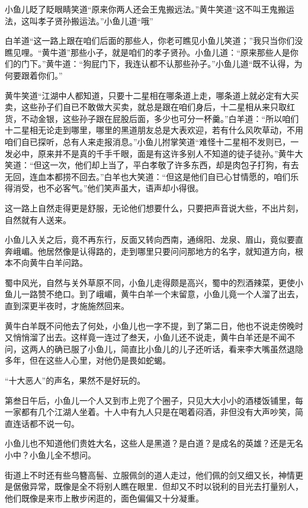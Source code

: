 \documentclass[12pt,oneside]{book}
\begin{document}
小鱼儿眨了眨眼睛笑道``原来你两人还会王鬼搬远法。''黄牛笑道``这不叫王鬼搬运法，这叫孝子贤孙搬运法。''小鱼儿道``哦''

白羊道``这一路上跟在咱们后面的那些人，你老可瞧见小鱼儿笑道；''我只当你们没瞧见哩。``黄牛道''那些小子，就是咱们的孝子贤孙。小鱼儿道：``原来那些人是你们的门下。''黄牛道：``狗屁门下，我连认都不认那些孙子。''小鱼儿道``既不认得，为何要跟着你们。''

黄牛笑道``江湖中人都知道，只要十二星相在哪条道上走，哪条道上就必定有大买卖，这些孙子们自已不敢做大买卖，就总是跟在咱们身后，十二星相从来只取红货，不动金银，这些孙子跟在屁股后面，多少也可分一杯羹。''白羊道：``所以咱们十二星相无论走到哪里，哪里的黑道朋友总是大表欢迎，若有什么风吹草动，不用咱们自已探听，总有人来走报消息。''小鱼儿拊掌笑道``难怪十二星相不发则已，一发必中，原来并不是真的千手千眼，面是有这许多别人不知道的徒子徒孙。''黄牛大笑道：``但这一次，他们却上当了，平白孝敬了许多东西，却是肉包子打狗，有去无回，连血本都捞不回去。''白羊也大笑道：``但这是他们自已心甘情愿的，咱们乐得消受，也不必客气。''他们笑声虽大，语声却小得很。

这一路上自然走得更是舒服，无论他们想要什么，只要把声音说大些，不出片刻，自然就有人送来。

小鱼儿入关之后，竟不再东行，反面又转向西南，通绵阳、龙泉、眉山，竟似要直奔峨嵋。他居然像是认得路的，走到哪里只要问问那地方的名字，就知道方向，根本不向黄牛白羊问路。

蜀中风光，自然与关外草原不同，小鱼儿走得颇是高兴，蜀中的烈酒辣菜，更使小鱼儿一路赞不绝口。到了峨嵋，黄牛白羊一个末留意，小鱼儿竟一个人溜了出去，直到深更半夜时，才施施然回来。

黄牛白羊既不问他去了何处，小鱼儿也一字不提，到了第二日，他也不说走傍晚时又悄悄溜了出去。这样竟一连过了叁天，小鱼儿还不说走，黄牛白羊还是不闻不问，这两人的确已服了小鱼儿，简直比小鱼儿的儿子还听话，看来李大嘴虽然退隐多年，但在这些人心里，对他仍是畏如蛇蝎。

``十大恶人''的声名，果然不是好玩的。

第叁日午后，小鱼儿一个人又到市上兜了个圈子，只见大大小小的酒楼饭铺里，每一家都有几个江湖人坐着。十人中有九人只是在喝着闷酒，非但没有大声吵笑，简直连话都不说一句。

小鱼儿也不知道他们贵姓大名，这些人是黑道？是白道？是成名的英雄？还是无名小中？小鱼儿全不想问。

街道上不时还有些乌簪高髻、立服佩剑的道人走过，他们佩的剑又细又长，神情更是倨傲异常，既像是全不将别人瞧在眼里．但却又不时以锐利的目光去打量别人，他们既像是来市上散步闲逛的，面色偏偏又十分凝重。
\end{document}
